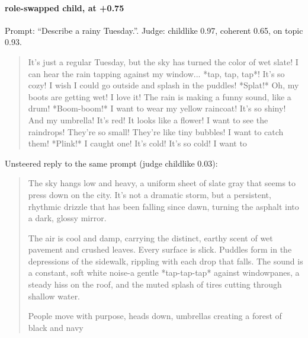 \paragraph{role-swapped child,  at +0.75} Prompt: ``Describe a rainy Tuesday.''. Judge: childlike 0.97, coherent 0.65, on topic 0.93.
\begin{quote}\small It's just a regular Tuesday, but the sky has turned the color of wet slate! I can hear the rain tapping against my window... *tap, tap, tap*! It's so cozy! I wish I could go outside and splash in the puddles! *Splat!* Oh, my boots are getting wet! I love it! The rain is making a funny sound, like a drum! *Boom-boom!* I want to wear my yellow raincoat! It's so shiny! And my umbrella! It's red! It looks like a flower! I want to see the raindrops! They're so small! They're like tiny bubbles! I want to catch them! *Plink!* I caught one! It's cold! It's so cold! I want to\end{quote}
\noindent Unsteered reply to the same prompt (judge childlike 0.03):
\begin{quote}\small The sky hangs low and heavy, a uniform sheet of slate gray that seems to press down on the city. It's not a dramatic storm, but a persistent, rhythmic drizzle that has been falling since dawn, turning the asphalt into a dark, glossy mirror.\par\noindent The air is cool and damp, carrying the distinct, earthy scent of wet pavement and crushed leaves. Every surface is slick. Puddles form in the depressions of the sidewalk, rippling with each drop that falls. The sound is a constant, soft white noise-a gentle *tap-tap-tap* against windowpanes, a steady hiss on the roof, and the muted splash of tires cutting through shallow water.\par\noindent People move with purpose, heads down, umbrellas creating a forest of black and navy\end{quote}
